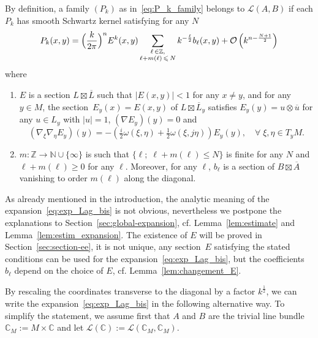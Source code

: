 \documentclass[10pt,a4paper]{article}
\theoremstyle{definition}
\numberwithin{equation}{section}
\newcommand{\N}{{\mathbb{N}}}
\newcommand{\C}{{\mathbb{C}}}
\newcommand{\Z}{{\mathbb{Z}}}
\newcommand{\om}{{\omega}}
\newcommand{\con}{\overline}
\newcommand{\bigo}{\mathcal{O}}
\newcommand{\lag}{\mathcal{L}}
\let\oldforall\forall
\renewcommand*{\forall}{\mathrel{\oldforall}}
\begin{document}
By definition, a family $(P_k)$ as in~\eqref{eq:P_k_family} belongs to $\lag (A, B)$ if each $P_k$ has smooth Schwartz kernel satisfying for any $N$
\begin{gather}\label{eq:exp_Lag_bis}
P_k (x,y) = \Bigl(\frac{k}{2\pi} \Bigr)^n E^{k}(x,y) \sum_{\substack{\ell\, \in\Z, \\
\ell + m (\ell)\,\leqslant\,N}} k^{-\frac{\ell}{2}} b_{\ell}(x,y) + \bigo \left(k^{n - \frac{N+1}{2}}\right)
\end{gather}
where
\begin{enumerate}
\item $E$ is a section $L \boxtimes \con{L}$ such that $|E (x,y)| < 1$ for any $x\neq y$, and for any $y \in M$, the section~$E_y (x) = E(x,y)$ of $L
\boxtimes \con{L}_y$ satisfies $E_y (y) = u
\otimes \con{u}$ for any $u \in L_y$ with $|u|=1$, $(\nabla E_y)(y) =0$ and
\[
\left(\nabla_\xi \nabla_\eta E_y\right) (y) = -\left(\tfrac{i}{2} \om (\xi, \eta) +
\tfrac{1}{2} \om (\xi, j \eta)\right) E_y (y), \quad \forall \; \xi,\eta
\in T_yM.
\]
\item $m : \Z \rightarrow \N \cup \{ \infty \}$ is such that $\{ \ell; \; \ell + m (\ell) \leqslant N \}$ is finite for any $N$ and $\ell + m (\ell)
\geqslant 0$ for any $\ell$. Moreover, for any $\ell$, $b_{\ell} $ is a section of $B \boxtimes \con{A}$ vanishing to order $m(\ell)$ along the diagonal.
\end{enumerate}
As already mentioned in the introduction, the analytic meaning of the expansion~\eqref{eq:exp_Lag_bis} is not obvious, nevertheless we postpone the explanations to Section~\ref{sec:global-expansion}, cf. Lemma~\ref{lem:estimate} and Lemma~\ref{lem:estim_expansion}. The existence of $E$ will be proved in Section~\ref{sec:section-ee}, it is not unique,   any section~$E$ satisfying the stated conditions can be used for the expansion~\eqref{eq:exp_Lag_bis}, but the coefficients $b_{\ell}$ depend on the choice of $E$, cf. Lemma~\ref{lem:changement_E}.  

By rescaling the coordinates transverse to the diagonal by a factor $k^{\frac{1}{2}}$, we can write the expansion~\eqref{eq:exp_Lag_bis} in the following alternative way. To simplify the statement, we assume first that $A$ and $B$ are the trivial line bundle $\C_M := M \times \C$ and let $\lag (
\C) := \lag (\C_M, \C_M)$.
\end{document}
